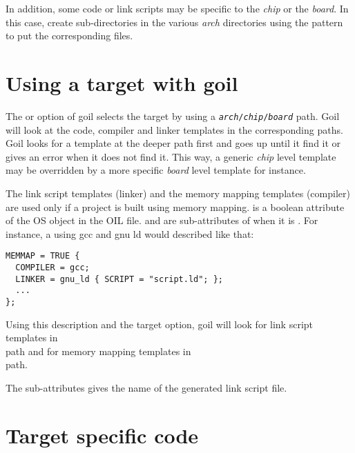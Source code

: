 In addition, some code or link scripts may be specific to the {\em chip} or the {\em board}. In this case, create sub-directories in the various {\em arch} directories using the pattern  to put the corresponding files.

\section{Using a target with goil}

The  or  option of goil selects the target by using a {\tt {\em arch}/{\em chip}/{\em board}} path. Goil will look at the code, compiler and linker templates in the corresponding paths. Goil looks for a template at the deeper path first and goes up until it find it or gives an error when it does not find it. This way, a generic {\em chip} level template may be overridden by a more specific {\em board} level template for instance.

The link script templates (linker) and the memory mapping templates (compiler) are used only if a project is built using memory mapping.  is a boolean attribute of the OS object in the OIL file.  and  are sub-attributes of  when it is . For instance, a  using gcc and gnu ld would described like that:

\begin{lstlisting}[language=OIL]
MEMMAP = TRUE {
  COMPILER = gcc;
  LINKER = gnu_ld { SCRIPT = "script.ld"; };
  ...
};
\end{lstlisting}

Using this description and the target option, goil will look for link script templates in\\  path and for memory mapping templates in\\  path.

The  sub-attributes gives the name of the generated link script file.

\section{Target specific code}


